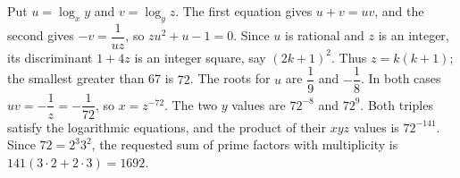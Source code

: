 Put $u=\log_xy$ and $v=\log_yz$. The first equation gives $u+v=uv$, and the second gives $- v = \dfrac{1}{uz}$, so $zu^2+u-1=0$. Since $u$ is rational and $z$ is an integer, its discriminant $1+4z$ is an integer square, say $(2k+1)^2$. Thus $z=k(k+1)$; the smallest greater than 67 is $72$. The roots for $u$ are $\dfrac{1}{9}$ and $- \dfrac{1}{8}$. In both cases $u v = - \dfrac{1}{z} = - \dfrac{1}{72}$, so $x=z^{-72}$. The two $y$ values are $72^{-8}$ and $72^9$. Both triples satisfy the logarithmic equations, and the product of their $xyz$ values is $72^{-141}$. Since $72=2^3 3^2$, the requested sum of prime factors with multiplicity is $141(3\cdot2+2\cdot3)=\boxed{1692}$.
